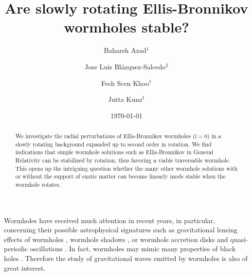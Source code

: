 \documentclass[twocolumn,showpacs,preprintnumbers,amsmath,amssymb,floatfix]{revtex4-1}
\begin{document}
\title{
Are slowly rotating Ellis-Bronnikov wormholes stable?}

\author{{Bahareh Azad$^1$}}
\author{Jose Luis Bl\'azquez-Salcedo$^2$}
\author{Fech Scen Khoo$^1$}
\author{{Jutta Kunz$^1$}}


\date{\today}
\pacs{}
\begin{abstract}
We investigate the radial perturbations of Ellis-Bronnikov wormholes ($\mathrm{l}=0$) in a slowly rotating background expanded up to second order in rotation.
We find indications that simple wormhole solutions such as Ellis-Bronnikov in General Relativity can be stabilized by rotation, thus favoring a viable traversable wormhole. 
This opens up the intriguing question whether the many other wormhole solutions with or without the support of exotic matter can become linearly mode stable when the wormhole rotates.
\end{abstract}

\maketitle


%
Wormholes have received much attention in recent years, in particular, concerning their possible astrophysical signatures such as gravitational lensing effects of wormholes
\cite{Cramer:1994qj,Safonova:2001vz,Perlick:2003vg,Nandi:2006ds,Abe:2010ap,Toki:2011zu,Nakajima:2012pu,Tsukamoto:2012xs,Kuhfittig:2013hva,Bambi:2013nla,Takahashi:2013jqa,Tsukamoto:2016zdu},
wormhole shadows
\cite{Bambi:2013nla,Nedkova:2013msa,Ohgami:2015nra,Shaikh:2018kfv,Gyulchev:2018fmd,Guerrero:2022qkh},
or wormhole accretion disks and quasi-periodic oscillations
\cite{Harko:2008vy,Harko:2009xf,Bambi:2013jda,Zhou:2016koy,Lamy:2018zvj,Deligianni:2021ecz,Deligianni:2021hwt}.
In fact, wormholes may mimic many properties of black holes 
\cite{Damour:2007ap,Bambi:2013nla,Azreg-Ainou:2014dwa,Dzhunushaliev:2016ylj,Cardoso:2016rao,Konoplya:2016hmd,Nandi:2016uzg,Bueno:2017hyj,Blazquez-Salcedo:2018ipc,Azad:2020ajs,Azad:2022qqn}.
Therefore the study of gravitational waves emitted by wormholes is also of great interest.
\end{document}
